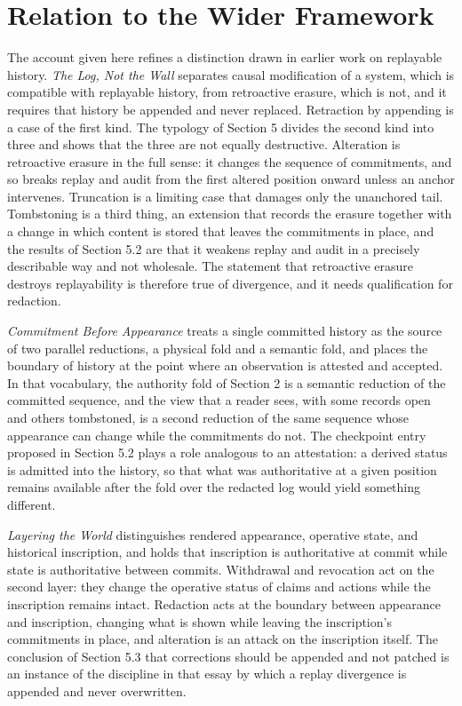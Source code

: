 \documentclass[11pt]{article}
\theoremstyle{plain}
\theoremstyle{definition}
\theoremstyle{remark}
\begin{document}
\section{Relation to the Wider Framework}
The account given here refines a distinction drawn in earlier work on replayable history. \emph{The Log, Not the Wall} separates causal modification of a system, which is compatible with replayable history, from retroactive erasure, which is not, and it requires that history be appended and never replaced. Retraction by appending is a case of the first kind. The typology of Section 5 divides the second kind into three and shows that the three are not equally destructive. Alteration is retroactive erasure in the full sense: it changes the sequence of commitments, and so breaks replay and audit from the first altered position onward unless an anchor intervenes. Truncation is a limiting case that damages only the unanchored tail. Tombstoning is a third thing, an extension that records the erasure together with a change in which content is stored that leaves the commitments in place, and the results of Section 5.2 are that it weakens replay and audit in a precisely describable way and not wholesale. The statement that retroactive erasure destroys replayability is therefore true of divergence, and it needs qualification for redaction.

\emph{Commitment Before Appearance} treats a single committed history as the source of two parallel reductions, a physical fold and a semantic fold, and places the boundary of history at the point where an observation is attested and accepted. In that vocabulary, the authority fold of Section 2 is a semantic reduction of the committed sequence, and the view that a reader sees, with some records open and others tombstoned, is a second reduction of the same sequence whose appearance can change while the commitments do not. The checkpoint entry proposed in Section 5.2 plays a role analogous to an attestation: a derived status is admitted into the history, so that what was authoritative at a given position remains available after the fold over the redacted log would yield something different.

\emph{Layering the World} distinguishes rendered appearance, operative state, and historical inscription, and holds that inscription is authoritative at commit while state is authoritative between commits. Withdrawal and revocation act on the second layer: they change the operative status of claims and actions while the inscription remains intact. Redaction acts at the boundary between appearance and inscription, changing what is shown while leaving the inscription's commitments in place, and alteration is an attack on the inscription itself. The conclusion of Section 5.3 that corrections should be appended and not patched is an instance of the discipline in that essay by which a replay divergence is appended and never overwritten.
\end{document}
